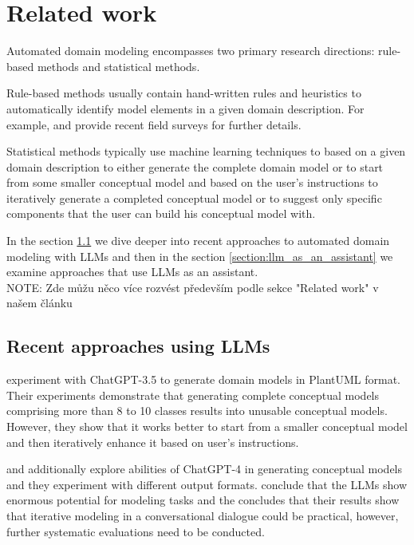 \chapter{Related work}

Automated domain modeling encompasses two primary research directions: rule-based methods and statistical methods.

Rule-based methods usually contain hand-written rules and heuristics to automatically identify model elements in a given domain description. For example, \citet{Raharjana2021} and \citet{Sonbol2022} provide recent field surveys for further details.

Statistical methods typically use machine learning techniques to based on a given domain description to either generate the complete domain model \cite{Chen2023,Saeedizade2024} or to start from some smaller conceptual model and based on the user's instructions to iteratively generate a completed conceptual model \cite{Camara2023} or to suggest only specific components that the user can build his conceptual model with.

In the section \ref{section:ref_recent_approaches_using_llms} we dive deeper into recent approaches to automated domain modeling with LLMs and then in the section \ref{section:llm_as_an_assistant} we examine approaches that use LLMs as an assistant. \\

NOTE: Zde můžu něco více rozvést především podle sekce "Related work" v našem článku


\section{Recent approaches using LLMs}
\label{section:ref_recent_approaches_using_llms}

\citet{Camara2023} experiment with ChatGPT-3.5 to generate domain models in PlantUML format. Their experiments demonstrate that generating complete conceptual models comprising more than 8 to 10 classes results into unusable conceptual models. However, they show that it works better to start from a smaller conceptual model and then iteratively enhance it based on user's instructions.

\citet{Fill2023} and \citet{Haerer2023} additionally explore abilities of ChatGPT-4 in generating conceptual models and they experiment with different output formats. \citet{Fill2023} conclude that the LLMs show enormous potential for modeling tasks and the \citet{Haerer2023} concludes that their results show that iterative modeling in a conversational dialogue could be practical, however, further systematic evaluations need to be conducted.

